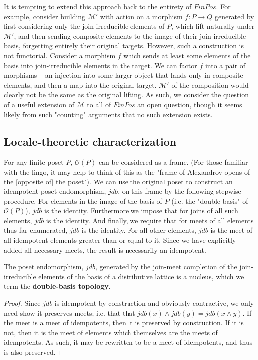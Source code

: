 \documentclass[hoptionsi,review,format=sigplan]{acmart}
\theoremstyle{definition}
\newcommand{\Mcc}{\mathcal{M}}
\newcommand{\Oc}{\mathcal{O}}
\begin{document}
It is tempting to extend this approach back to the entirety of \(FinPos\). For example, consider building \(\Mcc'\)  with action on a morphism \(f : P \rightarrow Q\) generated by first considering only the join-irreducible elements of \(P\), which lift naturally under \(\Mcc'\), and then sending composite elements to the image of their join-irreducible basis, forgetting entirely their original targets. However, such a construction is not functorial. Consider a morphism \(f\) which sends at least some  elements of the basis into join-irreducible elements in the target. We can factor \(f\) into a pair of morphisms -- an injection into some larger object that lands only in composite elements, and then a map into the original target. \(\Mcc'\) of the composition would clearly not be the same as the original lifting. As such, we consider the question of a useful extension of \(\Mcc\) to all of \(FinPos\) an open question, though it seems likely from such "counting" arguments that no such extension exists.

\subsection{Locale-theoretic characterization}

For any finite poset \(P\), \(\Oc(P)\) can be considered as a frame. (For those familiar with the lingo, it may help to think of this as the "frame of Alexandrov opens of the [opposite of] the poset"). We can use the original poset to construct an idempotent poset endomorphism, \(jdb\), on this frame by the following stepwise procedure. For elements in the image of the basis of \(P\) (i.e. the "double-basis" of \(\Oc(P)\)), \(jdb\) is the identity. Furthermore we impose that for joins of all such elements, \(jdb\) is the identity. And finally, we require that for meets of all elements thus far enumerated, \(jdb\) is the identity. For all other elements, \(jdb\) is the meet of all idempotent elements greater than or equal to it. Since we have explicitly added all necessary meets, the result is necessarily an idempotent.

\begin{lemma}
The poset endomorphism, \(jdb\), generated by the join-meet completion of the join-irreducible elements of the basis of a distributive lattice is a nucleus, which we term the \textbf{double-basis topology}.
\end{lemma}
\begin{proof}
Since \(jdb\) is idempotent by construction and obviously contractive, we only need show it preserves meets; i.e. that that \(jdb(x) \wedge jdb(y) = jdb(x  \wedge  y)\).  If the meet is a meet of idempotents, then it is preserved by construction. If it is not, then it is the meet of elements which themselves are the meets of idempotents. As such, it may be rewritten to be a meet of idempotents, and thus is also preserved.
\end{proof}
\end{document}
